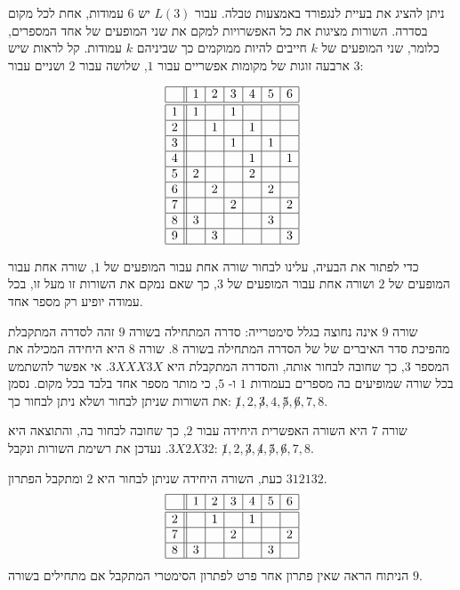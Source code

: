 ניתן להציג את בעיית לנגפורד
באמצעות טבלה. עבור
$L(3)$
יש
$6$
עמודות, אחת לכל מקום בסדרה. השורות מציגות את כל האפשרויות למקם את  שני המופעים של אחד המספרים, כלומר, שני המופעים של
$k$
חייבים להיות ממוקמים כך שביניהם 
$k$
עמודות. קל לראות שיש ארבעה זוגות של מקומות אפשריים עבור
$1$,
שלושה עבור
$2$
ושניים עבור
$3$:

\[
\begin{array}{|c||c|c|c|c|c|c|}
\hline
&1&2&3&4&5&6\\\hline\hline
1&1&&1&&&\\\hline
2&&1&&1&&\\\hline
3&&&1&&1&\\\hline
4&&&&1&&1\\\hline
5&2&&&2&&\\\hline
6&&2&&&2&\\\hline
7&&&2&&&2\\\hline
8&3&&&&3&\\\hline
9&&3&&&&3\\\hline
\end{array}
\]


כדי לפתור את הבעיה, עלינו לבחור שורה אחת עבור המופעים של
$1$,
שורה אחת עבור המופעים של
$2$
ושורה אחת עבור המופעים של
$3$,
כך שאם נמקם את השורות זו מעל זו, בכל עמודה יופיע רק מספר אחד.

שורה
$9$
אינה נחוצה בגלל סימטרייה: סדרה המתחילה בשורה
$9$
זהה לסדרה המתקבלת מהפיכת סדר האיברים של של הסדרה המתחילה בשורה
$8$.
שורה 
$8$
היא היחידה המכילה את המספר
$3$,
כך שחובה לבחור אותה, והסדרה המתקבלת היא
$3X  X  X  3X$. 
אי אפשר להשתמש בכל שורה שמופיעים בה מספרים בעמודות
$1$
ו-%
$5$,
כי מותר מספר אחד בלבד בכל מקום. נסמן את השורות שניתן לבחור ושלא ניתן לבחור כך:
$\not 1,2,\not 3,4,\not 5, \not 6, 7, 8$.

שורה
$7$
היא השורה האפשרית היחידה עבור
$2$,
כך שחובה לבחור בה, והתוצאה היא
$3X  2X  3{}2$.
נעדכן את רשימת השורות ונקבל:
$\not 1,2,\not 3,\not 4,\not 5, \not 6, 7, 8$.

כעת, השורה היחידה שניתן לבחור היא
$2$
ומתקבל הפתרון
$3{}1{}2{}1{}3{}2$.
\[
\begin{array}{|c||c|c|c|c|c|c|}
\hline
&1&2&3&4&5&6\\\hline\hline
2&&1&&1&&\\\hline
7&&&2&&&2\\\hline
8&3&&&&3&\\\hline
\end{array}
\]
הניתוח הראה שאין פתרון אחר פרט לפתרון הסימטרי המתקבל אם מתחילים בשורה
$9$.

